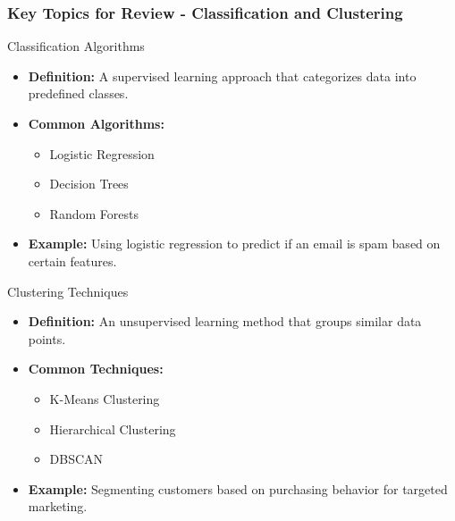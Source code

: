\documentclass{beamer}
\begin{document}
\begin{frame}[fragile]
    \frametitle{Key Topics for Review - Classification and Clustering}
    \begin{block}{Classification Algorithms}
        \begin{itemize}
            \item \textbf{Definition:} A supervised learning approach that categorizes data into predefined classes.
            \item \textbf{Common Algorithms:}
                \begin{itemize}
                    \item Logistic Regression
                    \item Decision Trees
                    \item Random Forests
                \end{itemize}
            \item \textbf{Example:} Using logistic regression to predict if an email is spam based on certain features.
        \end{itemize}
    \end{block}
    
    \begin{block}{Clustering Techniques}
        \begin{itemize}
            \item \textbf{Definition:} An unsupervised learning method that groups similar data points.
            \item \textbf{Common Techniques:}
                \begin{itemize}
                    \item K-Means Clustering
                    \item Hierarchical Clustering
                    \item DBSCAN
                \end{itemize}
            \item \textbf{Example:} Segmenting customers based on purchasing behavior for targeted marketing.
        \end{itemize}
    \end{block}
\end{frame}
\end{document}
